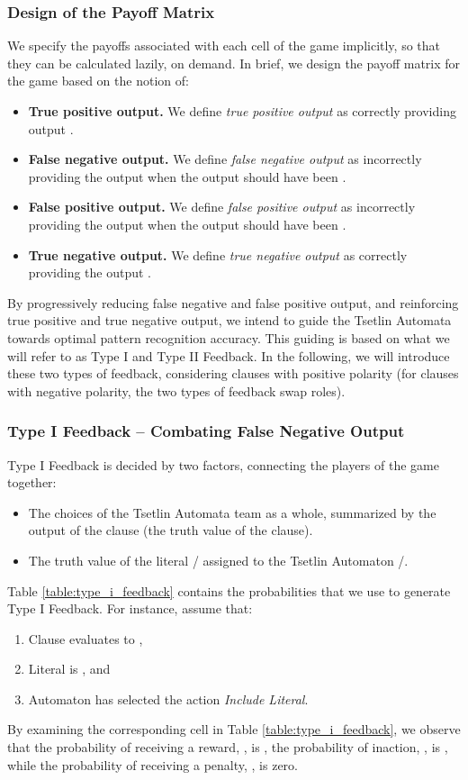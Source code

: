 \documentclass[11pt,a4paper]{article}
\begin{document}
\subsubsection{Design of the Payoff Matrix}
We specify the payoffs associated with each cell of the game implicitly, so that they can be calculated lazily, on demand. In brief, we design the payoff matrix for the game based on the notion of:
\begin{itemize}
    \item{\bf True positive output.} We define \emph{true positive output} as correctly providing output .
    \item{\bf False negative output.} We define \emph{false negative output} as incorrectly providing the output  when the output should have been .
    \item{\bf False positive output.} We define \emph{false positive output} as incorrectly providing the output  when the output should have been .
    \item{\bf True negative output.} We define \emph{true negative output} as correctly providing the output .
\end{itemize}
By progressively reducing false negative and false positive output, and reinforcing true positive and true negative output, we intend to guide the Tsetlin Automata towards optimal pattern recognition accuracy. This guiding is based on what we will refer to as Type I and Type II Feedback. In the following, we will 
introduce these two types of feedback, considering clauses with positive polarity (for clauses with negative polarity, the two types of feedback swap roles).

\subsubsection{Type I Feedback -- Combating False Negative Output}\label{sec:type_i_feedback}

Type I Feedback is decided by two factors, connecting the players of the game together:
\begin{itemize}
    \item The choices of the Tsetlin Automata team  as a whole, summarized by the output of the clause  (the truth value of the clause).
    \item The truth value of the literal / assigned to the Tsetlin Automaton /.
\end{itemize}
Table \ref{table:type_i_feedback} contains the probabilities that we use to generate  Type I Feedback. For instance, assume that:
\begin{enumerate}
    \item Clause  evaluates to ,
    \item Literal  is , and
    \item Automaton  has selected the action \emph{Include Literal}.
\end{enumerate}
By examining the corresponding cell in Table \ref{table:type_i_feedback}, we observe that the probability of receiving a reward, , is , the probability of inaction, , is , while the probability of receiving a penalty, , is zero.
\end{document}
